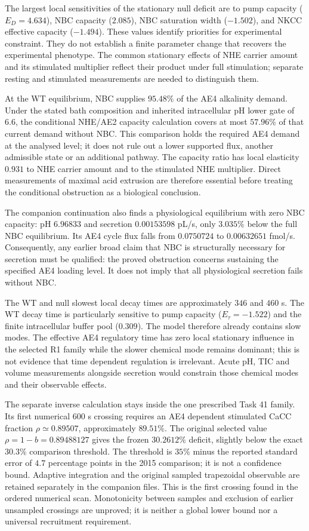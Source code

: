 The largest local sensitivities of the stationary null deficit are to pump capacity ($E_D=4.634$), NBC capacity ($2.085$), NBC saturation width ($-1.502$), and NKCC effective capacity ($-1.494$). These values identify priorities for experimental constraint. They do not establish a finite parameter change that recovers the experimental phenotype. The common stationary effects of NHE carrier amount and its stimulated multiplier reflect their product under full stimulation; separate resting and stimulated measurements are needed to distinguish them.

At the WT equilibrium, NBC supplies $95.48\%$ of the AE4 alkalinity demand. Under the stated bath composition and inherited intracellular pH lower gate of 6.6, the conditional NHE/AE2 capacity calculation covers at most $57.96\%$ of that current demand without NBC. This comparison holds the required AE4 demand at the analysed level; it does not rule out a lower supported flux, another admissible state or an additional pathway. The capacity ratio has local elasticity $0.931$ to NHE carrier amount and to the stimulated NHE multiplier. Direct measurements of maximal acid extrusion are therefore essential before treating the conditional obstruction as a biological conclusion.

The companion continuation also finds a physiological equilibrium with zero NBC capacity: pH $6.96833$ and secretion $0.00153598$ pL/s, only $3.035\%$ below the full NBC equilibrium. Its AE4 cycle flux falls from $0.0750724$ to $0.00632651$ fmol/s. Consequently, any earlier broad claim that NBC is structurally necessary for secretion must be qualified: the proved obstruction concerns sustaining the specified AE4 loading level. It does not imply that all physiological secretion fails without NBC.

The WT and null slowest local decay times are approximately $346$ and $460$ s. The WT decay time is particularly sensitive to pump capacity ($E_{\tau}=-1.522$) and the finite intracellular buffer pool ($0.309$). The model therefore already contains slow modes. The effective AE4 regulatory time has zero local stationary influence in the selected R1 family while the slower chemical mode remains dominant; this is not evidence that time dependent regulation is irrelevant. Acute pH, TIC and volume measurements alongside secretion would constrain those chemical modes and their observable effects.

The separate inverse calculation stays inside the one prescribed Task 41 family. Its first numerical 600 s crossing requires an AE4 dependent stimulated CaCC fraction $\rho\simeq0.89507$, approximately $89.51\%$. The original selected value $\rho=1-b=0.89488127$ gives the frozen $30.2612\%$ deficit, slightly below the exact $30.3\%$ comparison threshold. The threshold is $35\%$ minus the reported standard error of $4.7$ percentage points in the 2015 comparison; it is not a confidence bound. Adaptive integration and the original sampled trapezoidal observable are retained separately in the companion files. This is the first crossing found in the ordered numerical scan. Monotonicity between samples and exclusion of earlier unsampled crossings are unproved; it is neither a global lower bound nor a universal recruitment requirement.


